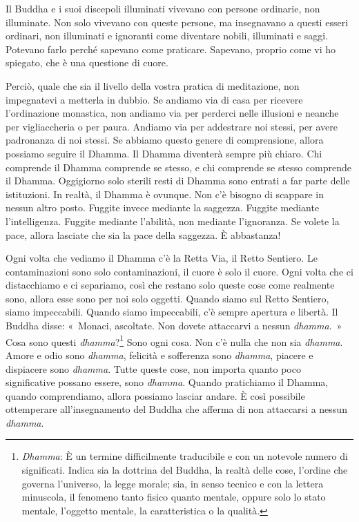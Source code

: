 Il Buddha e i suoi discepoli illuminati vivevano con persone ordinarie,
non illuminate. Non solo vivevano con queste persone, ma insegnavano a
questi esseri ordinari, non illuminati e ignoranti come diventare
nobili, illuminati e saggi. Potevano farlo perché sapevano come
praticare. Sapevano, proprio come vi ho spiegato, che è una questione di
cuore.

Perciò, quale che sia il livello della vostra pratica di meditazione,
non impegnatevi a metterla in dubbio. Se andiamo via di casa per
ricevere l'ordinazione monastica, non andiamo via per perderci nelle
illusioni e neanche per vigliaccheria o per paura. Andiamo via per
addestrare noi stessi, per avere padronanza di noi stessi. Se abbiamo
questo genere di comprensione, allora possiamo seguire il Dhamma. Il
Dhamma diventerà sempre più chiaro. Chi comprende il Dhamma comprende se
stesso, e chi comprende se stesso comprende il Dhamma. Oggigiorno solo
sterili resti di Dhamma sono entrati a far parte delle istituzioni. In
realtà, il Dhamma è ovunque. Non c'è bisogno di scappare in nessun altro
posto. Fuggite invece mediante la saggezza. Fuggite mediante
l'intelligenza. Fuggite mediante l'abilità, non mediante l'ignoranza. Se
volete la pace, allora lasciate che sia la pace della saggezza. È
abbastanza!

Ogni volta che vediamo il Dhamma c'è la Retta Via, il Retto Sentiero. Le
contaminazioni sono solo contaminazioni, il cuore è solo il cuore. Ogni
volta che ci distacchiamo e ci separiamo, così che restano solo queste
cose come realmente sono, allora esse sono per noi solo oggetti. Quando
siamo sul Retto Sentiero, siamo impeccabili. Quando siamo impeccabili,
c'è sempre apertura e libertà. Il Buddha disse: «~Monaci, ascoltate. Non
dovete attaccarvi a nessun \emph{dhamma}.~» Cosa sono questi
\emph{dhamma}?\footnote{\emph{Dhamma}: È un termine
  difficilmente traducibile e con un notevole numero di significati.
  Indica sia la dottrina del Buddha, la realtà delle cose, l'ordine che
  governa l'universo, la legge morale; sia, in senso tecnico e con la
  lettera minuscola, il fenomeno tanto fisico quanto mentale, oppure
  solo lo stato mentale, l'oggetto mentale, la caratteristica o la
  qualità.} Sono ogni cosa. Non c'è nulla che non sia \emph{dhamma}.
Amore e odio sono \emph{dhamma}, felicità e sofferenza sono
\emph{dhamma}, piacere e dispiacere sono \emph{dhamma}. Tutte queste
cose, non importa quanto poco significative possano essere, sono
\emph{dhamma}. Quando pratichiamo il Dhamma, quando comprendiamo, allora
possiamo lasciar andare. È così possibile ottemperare all'insegnamento
del Buddha che afferma di non attaccarsi a nessun \emph{dhamma}.


